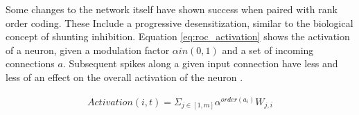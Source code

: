     Some changes to the network itself have shown success when paired with rank
    order coding. These Include a progressive desensitization, similar to the
    biological concept of shunting inhibition. Equation \ref{eq:roc_activation}
    shows the activation of a neuron, given a modulation factor
    $\alpha in (0,1)$ and a set of incoming connections $a$. Subsequent spikes along a
    given input connection have less and less of an effect on the overall
    activation of the neuron \cite{delorme_2001}.
    
    \begin{align}
        Activation(i,t) = \Sigma_{j \in [1,m]}\alpha^{order(a_i)}W_{j,i} \label{eq:roc_activation}
    \end{align}
    
    
    

